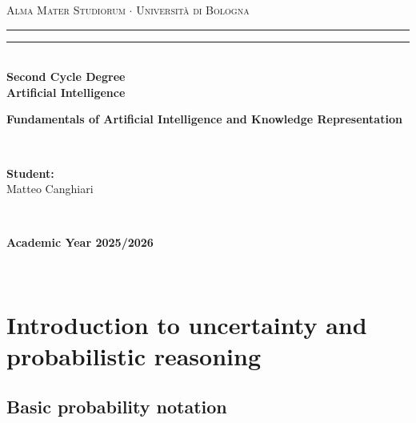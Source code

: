 \documentclass[12pt,a4paper,twoside]{book}
\begin{document}
\pagestyle{empty}
\begin{titlepage}
\begin{center}
    {{\Large{\textsc{Alma Mater Studiorum $\cdot$ Università di Bologna}}}}
    \rule[0.1cm]{\textwidth}{0.1mm}
    \rule[0.5cm]{\textwidth}{0.6mm}\\
    {\small{\bf Second Cycle Degree\\
    Artificial Intelligence}}
\end{center}

\vspace{45mm}

\begin{center}
    \textbf{Fundamentals of Artificial Intelligence and Knowledge Representation}
\end{center}

\vspace{60mm}
\par
\noindent
\begin{minipage}[t]{0.04\textwidth}
~
\end{minipage}
\begin{minipage}[t]{0.4\textwidth}
{{\textbf{Student:}\\
Matteo Canghiari}}
\end{minipage}
\begin{minipage}[t]{0.04\textwidth}
~
\end{minipage}

\vspace{30mm}

\begin{center}
    {\large{\bf Academic Year 2025/2026}}
\end{center}
\end{titlepage}

\restoregeometry

\pagestyle{empty}
\newpage~\newpage
\thispagestyle{empty}

\clearpage
{}
\pagestyle{plain}

\chapter{Introduction to uncertainty and probabilistic reasoning}

\label{c_1}

\section{Basic probability notation}

\label{s_1_1}
\end{document}
